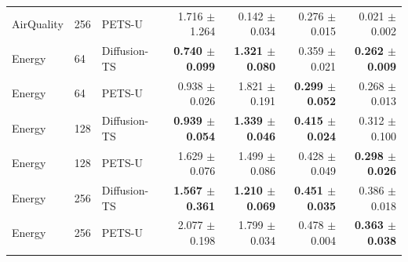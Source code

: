 \begin{table}[t]
\begin{tabular}{lllrrrr}
AirQuality & 256 & PETS-U & 1.716 $\pm$ 1.264 & 0.142 $\pm$ 0.034 & 0.276 $\pm$ 0.015 & 0.021 $\pm$ 0.002 \\
\addlinespace
Energy & 64 & Diffusion-TS & \textbf{0.740 $\pm$ 0.099} & \textbf{1.321 $\pm$ 0.080} & 0.359 $\pm$ 0.021 & \textbf{0.262 $\pm$ 0.009} \\
Energy & 64 & PETS-U & 0.938 $\pm$ 0.026 & 1.821 $\pm$ 0.191 & \textbf{0.299 $\pm$ 0.052} & 0.268 $\pm$ 0.013 \\
\addlinespace
Energy & 128 & Diffusion-TS & \textbf{0.939 $\pm$ 0.054} & \textbf{1.339 $\pm$ 0.046} & \textbf{0.415 $\pm$ 0.024} & 0.312 $\pm$ 0.100 \\
Energy & 128 & PETS-U & 1.629 $\pm$ 0.076 & 1.499 $\pm$ 0.086 & 0.428 $\pm$ 0.049 & \textbf{0.298 $\pm$ 0.026} \\
\addlinespace
Energy & 256 & Diffusion-TS & \textbf{1.567 $\pm$ 0.361} & \textbf{1.210 $\pm$ 0.069} & \textbf{0.451 $\pm$ 0.035} & 0.386 $\pm$ 0.018 \\
Energy & 256 & PETS-U & 2.077 $\pm$ 0.198 & 1.799 $\pm$ 0.034 & 0.478 $\pm$ 0.004 & \textbf{0.363 $\pm$ 0.038} \\
\addlinespace
\bottomrule
\end{tabular}
\end{table}
